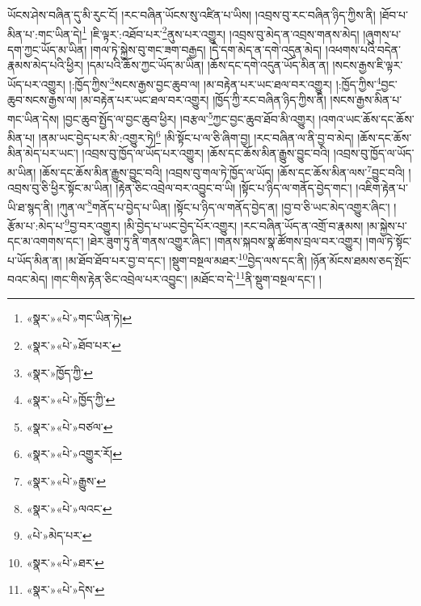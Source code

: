 ཡོངས་ཤེས་བཞིན་དུ་མི་རུང་ངོ། །རང་བཞིན་ཡོངས་སུ་འཛིན་པ་ཡིས། །འབྲས་བུ་རང་བཞིན་ཉིད་ཀྱིས་ནི། །ཐོབ་པ་མིན་པ་:གང་ཡིན་དེ།\footnote{«སྣར་»«པེ་»གང་ཡིན་ཏེ།} །ཇི་ལྟར་:འཐོབ་པར་\footnote{«སྣར་»«པེ་»ཐོབ་པར་}ནུས་པར་འགྱུར། །འབྲས་བུ་མེད་ན་འབྲས་གནས་མེད། །ཞུགས་པ་དག་ཀྱང་ཡོད་མ་ཡིན། །གལ་ཏེ་སྐྱེས་བུ་གང་ཟག་བརྒྱད། །དེ་དག་མེད་ན་དགེ་འདུན་མེད། །འཕགས་པའི་བདེན་རྣམས་མེད་པའི་ཕྱིར། །དམ་པའི་ཆོས་ཀྱང་ཡོད་མ་ཡིན། །ཆོས་དང་དགེ་འདུན་ཡོད་མིན་ན། །སངས་རྒྱས་ཇི་ལྟར་ཡོད་པར་འགྱུར། །:ཁྱོད་ཀྱིས་\footnote{«སྣར་»ཁྱོད་ཀྱི་}སངས་རྒྱས་བྱང་ཆུབ་ལ། །མ་བརྟེན་པར་ཡང་ཐལ་བར་འགྱུར། །:ཁྱོད་ཀྱིས་\footnote{«སྣར་»«པེ་»ཁྱོད་ཀྱི་}བྱང་ཆུབ་སངས་རྒྱས་ལ། །མ་བརྟེན་པར་ཡང་ཐལ་བར་འགྱུར། །ཁྱོད་ཀྱི་རང་བཞིན་ཉིད་ཀྱིས་ནི། །སངས་རྒྱས་མིན་པ་གང་ཡིན་དེས། །བྱང་ཆུབ་སྤྱོད་ལ་བྱང་ཆུབ་ཕྱིར། །བརྩལ་\footnote{«སྣར་»«པེ་»བཙལ་}ཀྱང་བྱང་ཆུབ་ཐོབ་མི་འགྱུར། །འགའ་ཡང་ཆོས་དང་ཆོས་མིན་པ། །ནམ་ཡང་བྱེད་པར་མི་:འགྱུར་ཏེ།\footnote{«སྣར་»«པེ་»འགྱུར་རོ།} །མི་སྟོང་པ་ལ་ཅི་ཞིག་བྱ། །རང་བཞིན་ལ་ནི་བྱ་བ་མེད། །ཆོས་དང་ཆོས་མིན་མེད་པར་ཡང་། །འབྲས་བུ་ཁྱོད་ལ་ཡོད་པར་འགྱུར། །ཆོས་དང་ཆོས་མིན་རྒྱུས་བྱུང་བའི། །འབྲས་བུ་ཁྱོད་ལ་ཡོད་མ་ཡིན། །ཆོས་དང་ཆོས་མིན་རྒྱུས་བྱུང་བའི། །འབྲས་བུ་གལ་ཏེ་ཁྱོད་ལ་ཡོད། །ཆོས་དང་ཆོས་མིན་ལས་\footnote{«སྣར་»«པེ་»རྒྱུས་}བྱུང་བའི། །འབྲས་བུ་ཅི་ཕྱིར་སྟོང་མ་ཡིན། །རྟེན་ཅིང་འབྲེལ་བར་འབྱུང་བ་ཡི། །སྟོང་པ་ཉིད་ལ་གནོད་བྱེད་གང་། །འཇིག་རྟེན་པ་ཡི་ཐ་སྙད་ནི། །ཀུན་ལ་\footnote{«སྣར་»«པེ་»ལའང་}གནོད་པ་བྱེད་པ་ཡིན། །སྟོང་པ་ཉིད་ལ་གནོད་བྱེད་ན། །བྱ་བ་ཅི་ཡང་མེད་འགྱུར་ཞིང་། །རྩོམ་པ་:མེད་པ་\footnote{«པེ་»མེད་པར་}བྱ་བར་འགྱུར། །མི་བྱེད་པ་ཡང་བྱེད་པོར་འགྱུར། །རང་བཞིན་ཡོད་ན་འགྲོ་བ་རྣམས། །མ་སྐྱེས་པ་དང་མ་འགགས་དང་། །ཐེར་ཟུག་ཏུ་ནི་གནས་འགྱུར་ཞིང་། །གནས་སྐབས་སྣ་ཚོགས་བྲལ་བར་འགྱུར། །གལ་ཏེ་སྟོང་པ་ཡོད་མིན་ན། །མ་ཐོབ་ཐོབ་པར་བྱ་བ་དང་། །སྡུག་བསྔལ་མཐར་\footnote{«སྣར་»«པེ་»ཐར་}བྱེད་ལས་དང་ནི། །ཉོན་མོངས་ཐམས་ཅད་སྤོང་བའང་མེད། །གང་གིས་རྟེན་ཅིང་འབྲེལ་པར་འབྱུང་། །མཐོང་བ་དེ་\footnote{«སྣར་»«པེ་»དེས་}ནི་སྡུག་བསྔལ་དང་། །
